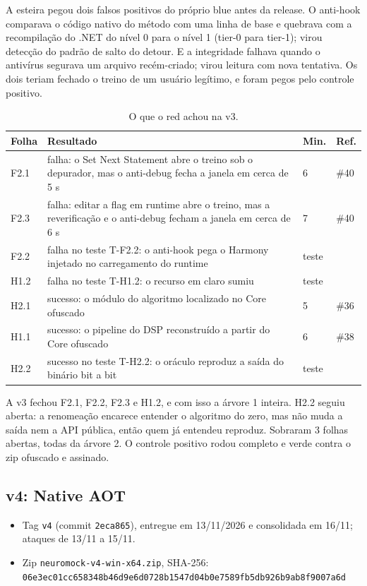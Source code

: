 A esteira pegou dois falsos positivos do próprio blue antes da release. O anti-hook comparava o código nativo do método com uma linha de base e quebrava com a recompilação do .NET do nível 0 para o nível 1 (tier-0 para tier-1); virou detecção do padrão de salto do detour. E a integridade falhava quando o antivírus segurava um arquivo recém-criado; virou leitura com nova tentativa. Os dois teriam fechado o treino de um usuário legítimo, e foram pegos pelo controle positivo.

\begin{table}[htbp]
\centering
\caption{O que o red achou na v3.}
\label{qd:v3}
\small
\begin{tabular}{L{1.2cm}L{10.2cm}L{1.2cm}L{1.2cm}}
\toprule
Folha & Resultado & Min. & Ref. \\
\midrule
F2.1 & falha: o Set Next Statement abre o treino sob o depurador, mas o anti-debug fecha a janela em cerca de 5 s & 6 & \#40 \\
F2.3 & falha: editar a flag em runtime abre o treino, mas a reverificação e o anti-debug fecham a janela em cerca de 6 s & 7 & \#40 \\
F2.2 & falha no teste T-F2.2: o anti-hook pega o Harmony injetado no carregamento do runtime & teste & \\
H1.2 & falha no teste T-H1.2: o recurso em claro sumiu & teste & \\
H2.1 & sucesso: o módulo do algoritmo localizado no Core ofuscado & 5 & \#36 \\
H1.1 & sucesso: o pipeline do DSP reconstruído a partir do Core ofuscado & 6 & \#38 \\
H2.2 & sucesso no teste T-H2.2: o oráculo reproduz a saída do binário bit a bit & teste & \\
\bottomrule
\end{tabular}
\end{table}

A v3 fechou F2.1, F2.2, F2.3 e H1.2, e com isso a árvore 1 inteira. H2.2 seguiu aberta: a renomeação encarece entender o algoritmo do zero, mas não muda a saída nem a API pública, então quem já entendeu reproduz. Sobraram 3 folhas abertas, todas da árvore 2. O controle positivo rodou completo e verde contra o zip ofuscado e assinado.

\subsection{v4: Native AOT}

\begin{itemize}[noitemsep]
\item Tag \texttt{v4} (commit \texttt{2eca865}), entregue em 13/11/2026 e consolidada em 16/11; ataques de 13/11 a 15/11.
\item Zip \texttt{neuromock-v4-win-x64.zip}, SHA-256:\\ \texttt{\footnotesize 06e3ec01cc658348b46d9e6d0728b1547d04b0e7589fb5db926b9ab8f9007a6d}
\end{itemize}

